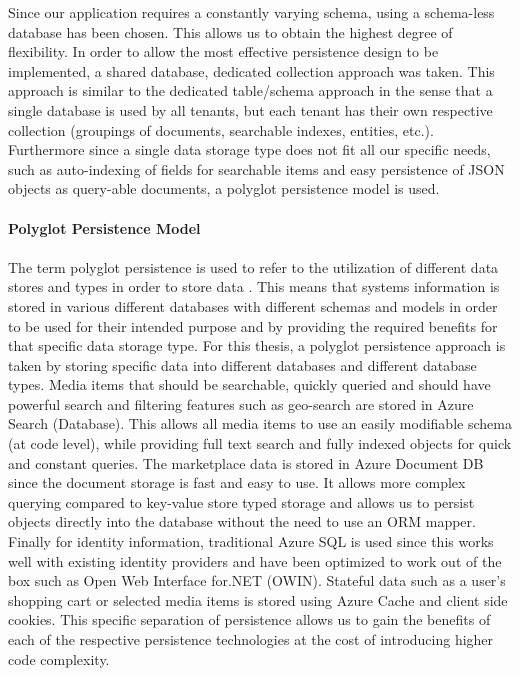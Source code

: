 Since our application requires a constantly varying schema, using a schema-less database has been chosen. This allows us to obtain the highest degree of flexibility. In order to allow the most effective persistence design to be implemented, a shared database, dedicated collection approach was taken. This approach is similar to the dedicated table/schema approach in the sense that a single database is used by all tenants, but each tenant has their own respective collection (groupings of documents, searchable indexes, entities, etc.). Furthermore since a single data storage type does not fit all our specific needs, such as auto-indexing of fields for searchable items and easy persistence of JSON objects as query-able documents, a polyglot persistence model is used.
\\
\\
\textbf{Polyglot Persistence Model}
\\
\\
The term polyglot persistence is used to refer to the utilization of different data stores and types in order to store data \cite{Sadalage2012-zw}. This means that systems information is stored in various different databases with different schemas and models in order to be used for their intended purpose and by providing the required benefits for that specific data storage type. For this thesis, a polyglot persistence approach is taken by storing specific data into different databases and different database types. Media items that should be searchable, quickly queried and should have powerful search and filtering features such as geo-search are stored in Azure Search  (Database). This allows all media items to use an easily modifiable schema (at code level), while providing full text search and fully indexed objects for quick and constant queries. The marketplace data is stored in Azure Document DB  since the document storage is fast and easy to use. It allows more complex querying compared to key-value store typed storage and allows us to persist objects directly into the database without the need to use an ORM mapper. Finally for identity information, traditional Azure SQL is used since this works well with existing identity providers and have been optimized to work out of the box such as Open Web Interface for.NET (OWIN). Stateful data such as a user's shopping cart or selected media items is stored using Azure Cache and client side cookies. This specific separation of persistence allows us to gain the benefits of each of the respective persistence technologies at the cost of introducing higher code complexity.


